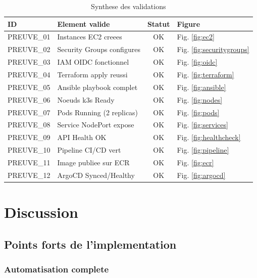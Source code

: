 \documentclass[12pt,a4paper,french]{report}
\begin{document}
\begin{table}[H]
    \centering
    \begin{tabular}{|l|l|c|l|}
        \hline
        \textbf{ID} & \textbf{Element valide} & \textbf{Statut} & \textbf{Figure} \\
        \hline
        PREUVE\_01 & Instances EC2 creees & OK & Fig. \ref{fig:ec2} \\
        PREUVE\_02 & Security Groups configures & OK & Fig. \ref{fig:securitygroups} \\
        PREUVE\_03 & IAM OIDC fonctionnel & OK & Fig. \ref{fig:oidc} \\
        PREUVE\_04 & Terraform apply reussi & OK & Fig. \ref{fig:terraform} \\
        PREUVE\_05 & Ansible playbook complet & OK & Fig. \ref{fig:ansible} \\
        PREUVE\_06 & Noeuds k3s Ready & OK & Fig. \ref{fig:nodes} \\
        PREUVE\_07 & Pods Running (2 replicas) & OK & Fig. \ref{fig:pods} \\
        PREUVE\_08 & Service NodePort expose & OK & Fig. \ref{fig:services} \\
        PREUVE\_09 & API Health OK & OK & Fig. \ref{fig:healthcheck} \\
        PREUVE\_10 & Pipeline CI/CD vert & OK & Fig. \ref{fig:pipeline} \\
        PREUVE\_11 & Image publiee sur ECR & OK & Fig. \ref{fig:ecr} \\
        PREUVE\_12 & ArgoCD Synced/Healthy & OK & Fig. \ref{fig:argocd} \\
        \hline
    \end{tabular}
    \caption{Synthese des validations}
    \label{table:validations}
\end{table}

\chapter{Discussion}

\section{Points forts de l'implementation}

\subsection{Automatisation complete}
\end{document}
